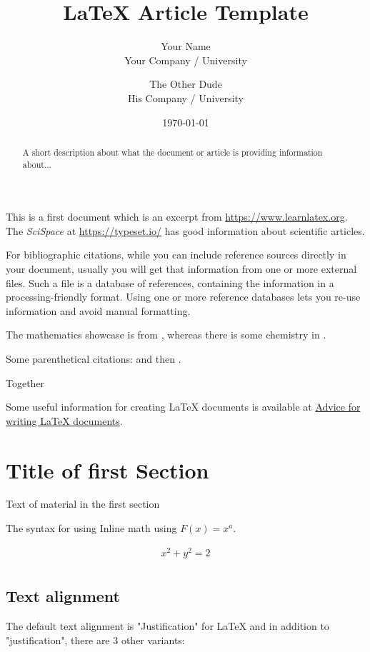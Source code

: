 \documentclass[12]{article}
\title{\LaTeX{} Article Template}
\author{Your Name  \\
	    Your Company / University  \\
	    \and
	    The Other Dude \\
	    His Company / University \\
	    }
\date{\today}
\begin{document}
\maketitle

\setcounter{tocdepth}{4}
\tableofcontents

\begin{abstract}
A short description about what the document or article is providing information about...
\end{abstract}

    This is a first document which is an excerpt from \url{https://www.learnlatex.org}. The \textit{SciSpace} at \url{https://typeset.io/} has good information about scientific articles.

    For bibliographic citations, while you can include reference sources directly in your document, usually you will get that information from one or more external files. Such a file is a database of references, containing the information in a processing-friendly format. Using one or more reference databases lets you re-use information and avoid manual formatting.

    The mathematics showcase is from \cite{Graham1995}, whereas there is some chemistry in \citet[p.~56]{Thomas2008}.

    Some parenthetical citations: \citep{Graham1995}
    and then \citep[p.~56]{Thomas2008}.

    \citep[See][pp.~45-~48]{Graham1995}

    Together \citep{Graham1995,Thomas2008}

    Some useful information for creating LaTeX documents is available at \href{https://github.com/dspinellis/latex-advice}{Advice for writing LaTeX documents}.

    \section{Title of first Section}%
    \label{sec:first-section}
    Text of material in the first section

    The syntax for using Inline math using \begin{math}F(x) = x^{a}\end{math}.

    \begin{align*}
        \label{eq:fraction}
        x^2 + y^2 = 2 \\
    \end{align*}

    \subsection{Text alignment}
    The default text alignment is "Justification" for LaTeX and in addition to "justification", there are \textrm{3} other variants:
\end{document}
